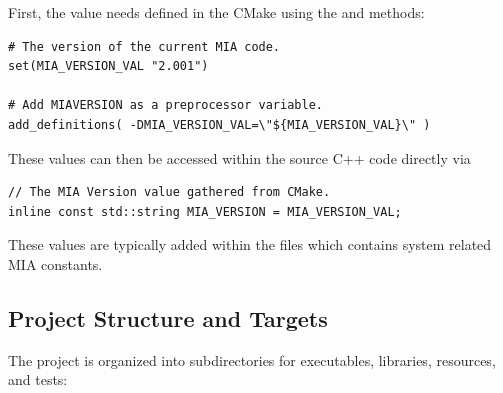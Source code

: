 First, the value needs defined in the CMake using the  and  methods:
\begin{lstlisting}[style=makestyle]
# The version of the current MIA code.
set(MIA_VERSION_VAL "2.001")

# Add MIAVERSION as a preprocessor variable.
add_definitions( -DMIA_VERSION_VAL=\"${MIA_VERSION_VAL}\" )
\end{lstlisting}
These values can then be accessed within the source C++ code directly via
\begin{lstlisting}[style=cppstyle]
// The MIA Version value gathered from CMake.
inline const std::string MIA_VERSION = MIA_VERSION_VAL;
\end{lstlisting}
These values are typically added within the  files which contains system related MIA constants. 

\subsection{Project Structure and Targets}

The project is organized into subdirectories for executables, libraries, resources, and tests:

